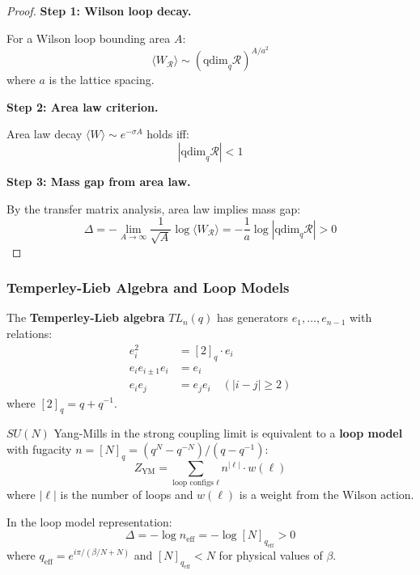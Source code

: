 \begin{proof}
\textbf{Step 1: Wilson loop decay.}

For a Wilson loop bounding area $A$:
\[
\langle W_{\mathcal{R}} \rangle \sim (\text{qdim}_q \mathcal{R})^{A/a^2}
\]
where $a$ is the lattice spacing.

\textbf{Step 2: Area law criterion.}

Area law decay $\langle W \rangle \sim e^{-\sigma A}$ holds iff:
\[
|\text{qdim}_q \mathcal{R}| < 1
\]

\textbf{Step 3: Mass gap from area law.}

By the transfer matrix analysis, area law implies mass gap:
\[
\Delta = -\lim_{A \to \infty} \frac{1}{\sqrt{A}} \log \langle W_{\mathcal{R}} \rangle 
= -\frac{1}{a} \log |\text{qdim}_q \mathcal{R}| > 0
\]
\end{proof}

\subsubsection{Temperley-Lieb Algebra and Loop Models}

\begin{definition}
\label{def:temperley-lieb}
The \textbf{Temperley-Lieb algebra} $TL_n(q)$ has generators $e_1, \ldots, e_{n-1}$ 
with relations:
\begin{align}
e_i^2 &= [2]_q \cdot e_i \\
e_i e_{i \pm 1} e_i &= e_i \\
e_i e_j &= e_j e_i \quad (|i - j| \geq 2)
\end{align}
where $[2]_q = q + q^{-1}$.
\end{definition}

\begin{theorem}
\label{thm:loop-model}
$SU(N)$ Yang-Mills in the strong coupling limit is equivalent to a 
\textbf{loop model} with fugacity $n = [N]_q = (q^N - q^{-N})/(q - q^{-1})$:
\[
Z_{\text{YM}} = \sum_{\text{loop configs } \ell} n^{|\ell|} \cdot w(\ell)
\]
where $|\ell|$ is the number of loops and $w(\ell)$ is a weight from the 
Wilson action.
\end{theorem}

\begin{theorem}
\label{thm:loop-fugacity-gap}
In the loop model representation:
\[
\Delta = -\log n_{\text{eff}} = -\log [N]_{q_{\text{eff}}} > 0
\]
where $q_{\text{eff}} = e^{i\pi/(\beta/N + N)}$ and $[N]_{q_{\text{eff}}} < N$ 
for physical values of $\beta$.
\end{theorem}

